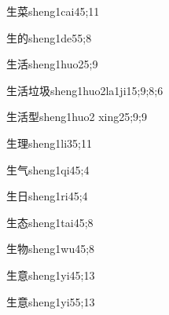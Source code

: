 \begin{verbete}{生菜}{sheng1cai4}{5;11}
\end{verbete}

\begin{verbete}{生的}{sheng1de5}{5;8}
\end{verbete}

\begin{verbete}{生活}{sheng1huo2}{5;9}
\end{verbete}

\begin{verbete}{生活垃圾}{sheng1huo2la1ji1}{5;9;8;6}
\end{verbete}

\begin{verbete}{生活型}{sheng1huo2 xing2}{5;9;9}
\end{verbete}

\begin{verbete}{生理}{sheng1li3}{5;11}
\end{verbete}

\begin{verbete}{生气}{sheng1qi4}{5;4}
\end{verbete}

\begin{verbete}{生日}{sheng1ri4}{5;4}
\end{verbete}

\begin{verbete}{生态}{sheng1tai4}{5;8}
\end{verbete}

\begin{verbete}{生物}{sheng1wu4}{5;8}
\end{verbete}

\begin{verbete}{生意}{sheng1yi4}{5;13}
\end{verbete}

\begin{verbete}{生意}{sheng1yi5}{5;13}
\end{verbete}

